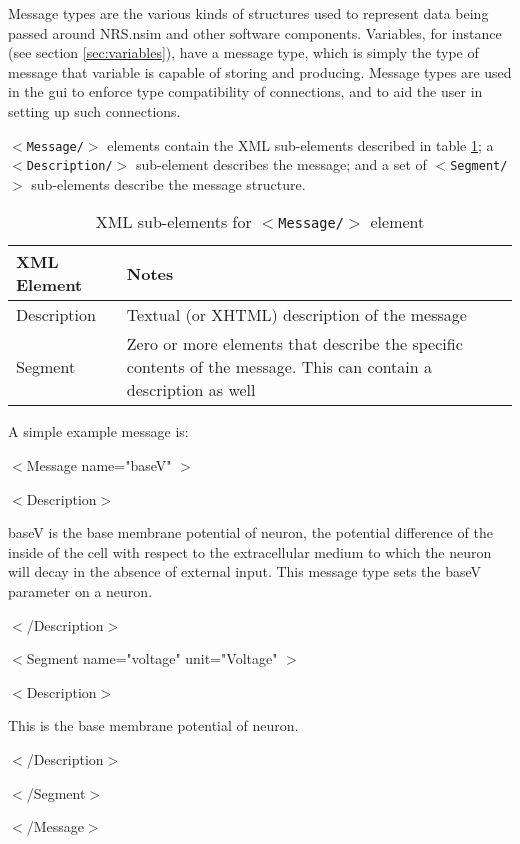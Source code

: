 \documentclass[pdftex,a4paper]{article}
\newcommand{\XML}[2][]{{\tt \small $<$#2#1/$>$}}
\newcommand{\XMLtext}[1]{
  \begin{tt}
    \begin{small}
      \begin{list}{}{
          \setlength{\topsep}{0pt}
          \setlength{\partopsep}{0pt}
          \setlength{\itemsep}{0pt}
          \setlength{\parsep}{0pt}
          \setlength{\leftmargin}{2em}
          \setlength{\rightmargin}{2em}
          \setlength{\labelsep}{0pt}
        }
      \item #1
      \end{list}
    \end{small}
  \end{tt}
}
\newcommand{\XMLfull}[3][]{\XMLtext{$<$#2#1$>$
    #3
  \item $<$/#2$>$}}
\begin{document}
Message types are the various kinds of structures used to represent data
being passed around NRS.nsim and other software components. Variables,
for instance (see section \ref{sec:variables}), have a message type,
which is simply the type of message that variable is capable of storing
and producing.  Message types are used in the gui to enforce type
compatibility of connections, and to aid the user in setting up such
connections.

\XML{Message} elements contain the XML sub-elements described in table
\ref{tab:msg_subelt}; a \XML{Description} sub-element describes the
message; and a set of \XML{Segment} sub-elements describe the message
structure.

\begin{table}[!h]
  \begin{center}
    \caption{XML sub-elements for \XML{Message} element}
    \label{tab:msg_subelt}
    \begin{tabular}{|l|p{6cm}|}
      \hline

      \textbf{XML Element} & \textbf{Notes}\\

      \hline

      Description & Textual (or XHTML) description of the message\\

      \hline

      Segment & Zero or more elements that describe the specific
      contents of the message. This can contain a description as
      well\\

      \hline
    \end{tabular}
  \end{center}
\end{table}


A simple example message is:

\XMLfull[ name="baseV" ]{Message}{
  \XMLfull{Description}{
    \XMLtext{baseV is the base membrane potential of neuron, the potential
    difference of the inside of the cell with respect to the
    extracellular medium to which the neuron will decay in the absence
    of external input. This message type sets the baseV parameter on a
    neuron.}
  }
  \XMLfull[ name="voltage" unit="Voltage" ]{Segment}{
    \XMLfull{Description}{
      \XMLtext{This is the base membrane potential of neuron.}
    }
  }
}
\end{document}
